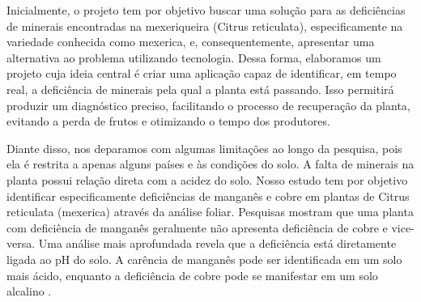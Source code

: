 Inicialmente, o projeto tem por objetivo buscar uma solução para as deficiências de minerais encontradas na mexeriqueira (Citrus reticulata), especificamente na variedade conhecida como mexerica, e, consequentemente, apresentar uma alternativa ao problema utilizando tecnologia. Dessa forma, elaboramos um projeto cuja ideia central é criar uma aplicação capaz de identificar, em tempo real, a deficiência de minerais pela qual a planta está passando. Isso permitirá produzir um diagnóstico preciso, facilitando o processo de recuperação da planta, evitando a perda de frutos e otimizando o tempo dos produtores.

Diante disso, nos deparamos com algumas limitações ao longo da pesquisa, pois ela é restrita a apenas alguns países e às condições do solo. A falta de minerais na planta possui relação direta com a acidez do solo. Nosso estudo tem por objetivo identificar especificamente deficiências de manganês e cobre em plantas de Citrus reticulata (mexerica) através da análise foliar. Pesquisas mostram que uma planta com deficiência de manganês geralmente não apresenta deficiência de cobre e vice-versa. Uma análise mais aprofundada revela que a deficiência está diretamente ligada ao pH do solo. A carência de manganês pode ser identificada em um solo mais ácido, enquanto a deficiência de cobre pode se manifestar em um solo alcalino \cite{ConclusãoMicroN, ConclusãoCobre}.